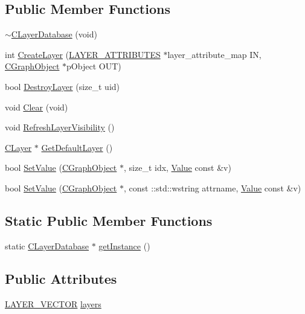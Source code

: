 \subsection*{Public Member Functions}
\begin{DoxyCompactItemize}
\item 
\hyperlink{class_c_layer_database_a33a784f25a2d0c44b500aedeb168b9dc}{$\sim$\+C\+Layer\+Database} (void)
\item 
int \hyperlink{class_c_layer_database_a66f1d9142a5383aa7f6b9a2118f1cc78}{Create\+Layer} (\hyperlink{_object_database_defines_8h_a226fd5702689bb803657e3a25162c172}{L\+A\+Y\+E\+R\+\_\+\+A\+T\+T\+R\+I\+B\+U\+T\+E\+S} $\ast$layer\+\_\+attribute\+\_\+map I\+N, \hyperlink{class_c_graph_object}{C\+Graph\+Object} $\ast$p\+Object O\+U\+T)
\item 
bool \hyperlink{class_c_layer_database_aece92b9b90d321a9a86bfeed4045888d}{Destroy\+Layer} (size\+\_\+t uid)
\item 
void \hyperlink{class_c_layer_database_ae689127412b99fe775274066c74c7b3f}{Clear} (void)
\item 
void \hyperlink{class_c_layer_database_a14a1f10ae989e9ec9069c11f54c4cc8e}{Refresh\+Layer\+Visibility} ()
\item 
\hyperlink{class_c_layer}{C\+Layer} $\ast$ \hyperlink{class_c_layer_database_ae2f10b514190d33eaae7602814a13e5f}{Get\+Default\+Layer} ()
\item 
bool \hyperlink{class_c_layer_database_a381a0175a4da8845fc36c292b1d9e368}{Set\+Value} (\hyperlink{class_c_graph_object}{C\+Graph\+Object} $\ast$, size\+\_\+t idx, \hyperlink{class_value}{Value} const \&v)
\item 
bool \hyperlink{class_c_layer_database_ae14a3945de89a103480cb36001ada125}{Set\+Value} (\hyperlink{class_c_graph_object}{C\+Graph\+Object} $\ast$, const \+::std\+::wstring attrname, \hyperlink{class_value}{Value} const \&v)
\end{DoxyCompactItemize}
\subsection*{Static Public Member Functions}
\begin{DoxyCompactItemize}
\item 
static \hyperlink{class_c_layer_database}{C\+Layer\+Database} $\ast$ \hyperlink{class_c_layer_database_a937c71e137767fe4511d2649ff6e5122}{get\+Instance} ()
\end{DoxyCompactItemize}
\subsection*{Public Attributes}
\begin{DoxyCompactItemize}
\item 
\hyperlink{class_c_layer_database_a744d054c8d962f3ba71d30d7ba0f3811}{L\+A\+Y\+E\+R\+\_\+\+V\+E\+C\+T\+O\+R} \hyperlink{class_c_layer_database_a7966885ad0f4bf5cedaa8596af46dad7}{layers}
\end{DoxyCompactItemize}
